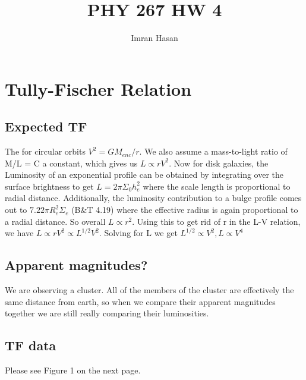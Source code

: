 \documentclass[12pt]{article}
\begin{document}
\title{PHY 267 HW 4}
\author{Imran Hasan}
\maketitle

\section{Tully-Fischer Relation}
\subsection{Expected TF}
The for circular orbits $V^{2} = GM_{enc}/r$. We also assume a mass-to-light ratio of M/L = C a constant, which gives us $L \propto rV^{2}$. Now for disk galaxies, the Luminosity of an exponential profile can be obtained by integrating over the surface brightness to get $L = 2\pi \Sigma_{0} h_{e}^{2} $ where the scale length is proportional to radial distance. Additionally, the luminosity contribution to a bulge profile comes out to $7.22 \pi R_{e}^{2} \Sigma_{e}$ (B\&T 4.19) where the effective radius is again proportional to a radial distance. So overall $L \propto r^{2}$. Using this to get rid of r in the L-V relation, we have $ L \propto rV^{2} \propto L^{1/2}V^{2}$. Solving for L we get $L^{1/2} \propto V^{2}, L \propto V^{4}$

\subsection{Apparent magnitudes?}
We are observing a cluster. All of the members of the cluster are effectively the same distance from earth, so when we compare their apparent magnitudes together we are still really comparing their luminosities.

\subsection{TF data}
Please see Figure 1 on the next page.
\end{document}
